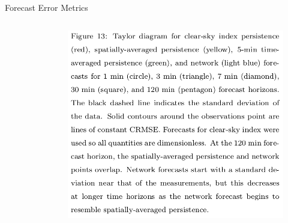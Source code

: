 \documentclass[aspectratio=169]{beamer}
\begin{document}
\begin{frame}{Forecast Error Metrics}
\begin{columns}
\begin{column}{0.3\textwidth}
\begin{figure}[h]
\end{figure}
\end{column}
\begin{column}{0.3\textwidth}
\begin{figure}[h]
  \includegraphics[height=.4\textheight]{figs/old_taylor_cap.png}
\end{figure}
\end{column}
\end{columns}
\end{frame}
\end{document}
